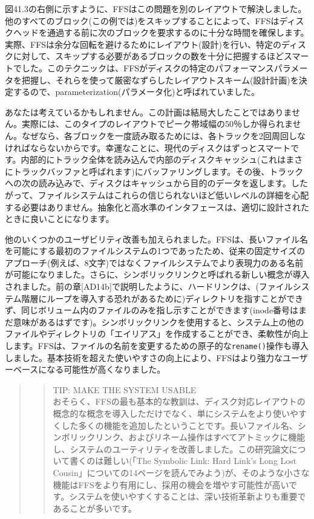 図41.3の右側に示すように、FFSはこの問題を別のレイアウトで解決しました。他のすべてのブロック(この例では)をスキップすることによって、FFSはディスクヘッドを通過する前に次のブロックを要求するのに十分な時間を確保します。実際、FFSは余分な回転を避けるためにレイアウト(設計)を行い、特定のディスクに対して、スキップする必要があるブロックの数を十分に把握するほどスマートでした。このテクニックは、FFSがディスクの特定のパフォーマンスパラメータを把握し、それらを使って厳密なずらしたレイアウトスキーム(設計計画)を決定するので、parameterization(パラメータ化)と呼ばれていました。

あなたは考えているかもしれません。この計画は結局大したことではありません。実際には、このタイプのレイアウトでピーク帯域幅の50％しか得られません。なぜなら、各ブロックを一度読み取るためには、各トラックを2回周回しなければならないからです。幸運なことに、現代のディスクはずっとスマートです。内部的にトラック全体を読み込んで内部のディスクキャッシュ(これはまさにトラックバッファと呼ばれます)にバッファリングします。その後、トラックへの次の読み込みで、ディスクはキャッシュから目的のデータを返します。したがって、ファイルシステムはこれらの信じられないほど低いレベルの詳細を心配する必要はありません。抽象化と高水準のインタフェースは、適切に設計されたときに良いことになります。

他のいくつかのユーザビリティ改善も加えられました。FFSは、長いファイル名を可能にする最初のファイルシステムの1つであったため、従来の固定サイズのアプローチ(例えば、8文字)ではなくファイルシステムでより表現力のある名前が可能になりました。さらに、シンボリックリンクと呼ばれる新しい概念が導入されました。前の章{[}AD14b{]}で説明したように、ハードリンクは、(ファイルシステム階層にループを導入する恐れがあるために)ディレクトリを指すことができず、同じボリューム内のファイルのみを指し示すことができます(inode番号はまだ意味があるはずです)。シンボリックリンクを使用すると、システム上の他のファイルやディレクトリの「エイリアス」を作成することができ、柔軟性が向上します。FFSは、ファイルの名前を変更するための原子的な\texttt{rename()}操作も導入しました。基本技術を超えた使いやすさの向上により、FFSはより強力なユーザーベースになる可能性が高くなりました。

\begin{quote}
\begin{quote}
TIP: MAKE THE SYSTEM USABLE\\
おそらく、FFSの最も基本的な教訓は、ディスク対応レイアウトの概念的な概念を導入しただけでなく、単にシステムをより使いやすくした多くの機能を追加したということです。長いファイル名、シンボリックリンク、およびリネーム操作はすべてアトミックに機能し、システムのユーティリティを改善しました。この研究論文について書くのは難しい(「The
Symbolic Link: Hard Link's Long Lost
Cousin」についての14ページを読んでみよう)が、そのような小さな機能はFFSをより有用にし、採用の機会を増やす可能性が高いです。システムを使いやすくすることは、深い技術革新よりも重要であることが多いです。
\end{quote}
\end{quote}

